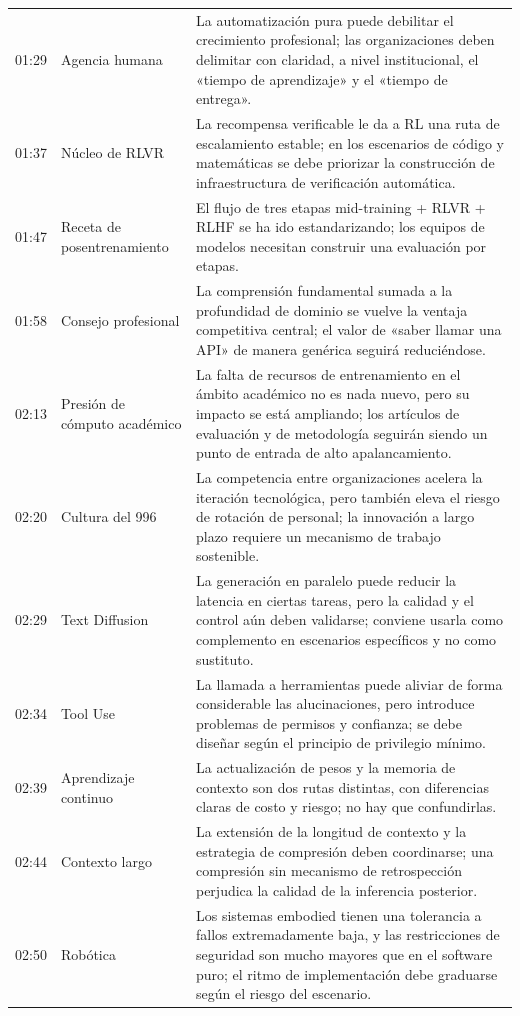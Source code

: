 \documentclass[a4paper]{article}
\begin{document}
\begin{longtable}{p{}p{}p{}}
01:29 & Agencia humana & La automatización pura puede debilitar el crecimiento profesional; las organizaciones deben delimitar con claridad, a nivel institucional, el «tiempo de aprendizaje» y el «tiempo de entrega». \\
01:37 & Núcleo de RLVR & La recompensa verificable le da a RL una ruta de escalamiento estable; en los escenarios de código y matemáticas se debe priorizar la construcción de infraestructura de verificación automática. \\
01:47 & Receta de posentrenamiento & El flujo de tres etapas mid-training + RLVR + RLHF se ha ido estandarizando; los equipos de modelos necesitan construir una evaluación por etapas. \\
01:58 & Consejo profesional & La comprensión fundamental sumada a la profundidad de dominio se vuelve la ventaja competitiva central; el valor de «saber llamar una API» de manera genérica seguirá reduciéndose. \\
02:13 & Presión de cómputo académico & La falta de recursos de entrenamiento en el ámbito académico no es nada nuevo, pero su impacto se está ampliando; los artículos de evaluación y de metodología seguirán siendo un punto de entrada de alto apalancamiento. \\
02:20 & Cultura del 996 & La competencia entre organizaciones acelera la iteración tecnológica, pero también eleva el riesgo de rotación de personal; la innovación a largo plazo requiere un mecanismo de trabajo sostenible. \\
02:29 & Text Diffusion & La generación en paralelo puede reducir la latencia en ciertas tareas, pero la calidad y el control aún deben validarse; conviene usarla como complemento en escenarios específicos y no como sustituto. \\
02:34 & Tool Use & La llamada a herramientas puede aliviar de forma considerable las alucinaciones, pero introduce problemas de permisos y confianza; se debe diseñar según el principio de privilegio mínimo. \\
02:39 & Aprendizaje continuo & La actualización de pesos y la memoria de contexto son dos rutas distintas, con diferencias claras de costo y riesgo; no hay que confundirlas. \\
02:44 & Contexto largo & La extensión de la longitud de contexto y la estrategia de compresión deben coordinarse; una compresión sin mecanismo de retrospección perjudica la calidad de la inferencia posterior. \\
02:50 & Robótica & Los sistemas embodied tienen una tolerancia a fallos extremadamente baja, y las restricciones de seguridad son mucho mayores que en el software puro; el ritmo de implementación debe graduarse según el riesgo del escenario. \\

\end{longtable}
\end{document}
